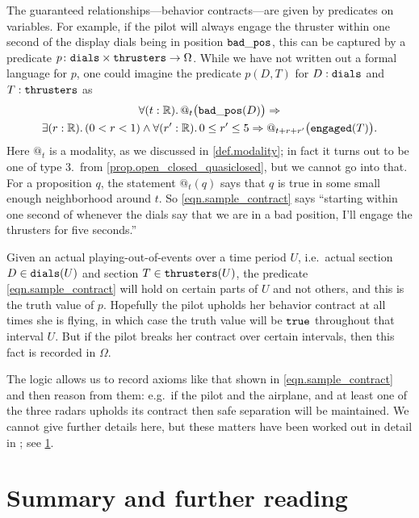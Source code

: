 \documentclass[7Sketches]{subfiles}
\begin{document}
The guaranteed relationships---behavior contracts---are given by predicates on variables. For example, if the pilot will always engage the thruster within one second of the display dials being in position $\mathtt{bad\_pos}$, this can be captured by a predicate $p\colon\mathtt{dials}\times\mathtt{thrusters}\to\Omega$. While we have not written out a formal language for $p$, one could imagine the predicate $p(D,T)$ for $D:\mathtt{dials}$ and $T:\mathtt{thrusters}$ as
\begin{multline}%
\label{eqn.sample_contract}
  \forall(t:\RR)\ldotp @_{t}\big(\const{bad\_pos}(D)\big)\imp\\
  \exists(r:\RR)\ldotp(0<r<1)\wedge\forall(r':\RR)\ldotp 0\leq r'\leq 5\imp @_{t+r+r'}\big(\const{engaged}(T)\big).
\end{multline}
Here $@_t$ is a modality, as we discussed in \cref{def.modality}; in fact it turns out to be one of type 3.\ from \cref{prop.open_closed_quasiclosed}, but we cannot go into that. For a proposition $q$, the statement $@_t(q)$ says that $q$ is true in some small enough neighborhood around $t$. So \eqref{eqn.sample_contract} says ``starting within one second of whenever the dials say that we are in a bad position, I'll engage the thrusters for five seconds.'' %

Given an actual playing-out-of-events over a time period $U$, i.e.\ actual section $D\in\mathtt{dials}(U)$ and section $T\in\mathtt{thrusters}(U)$, the
predicate \cref{eqn.sample_contract} will hold on certain parts of $U$ and not others, and this is the truth value of $p$. Hopefully the pilot upholds her behavior contract at all
times she is flying, in which case the truth value will be $\mathtt{true}$ throughout that interval $U$. But if the pilot breaks her contract over certain intervals, then this fact is recorded in $\Omega$.

The logic allows us to record axioms like that shown in \cref{eqn.sample_contract} and then reason from them: e.g.\ if the pilot and the airplane, and at least one of the three radars upholds its contract then safe separation will be maintained. We cannot give further details here, but these matters have been worked out in detail in \cite{Schultz.Spivak:2017a}; see \cref{sec.C7_further_reading}.

\section{Summary and further reading}%
\label{sec.C7_further_reading}
\end{document}
